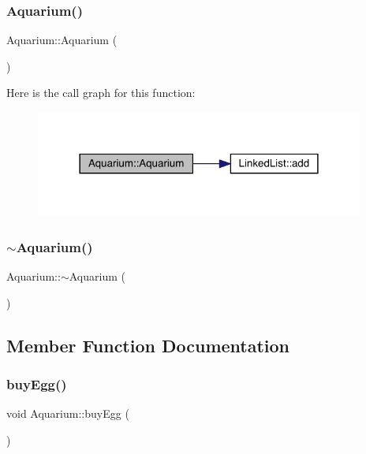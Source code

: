 \subsubsection{\texorpdfstring{Aquarium()}{Aquarium()}}
{\footnotesize\ttfamily Aquarium\+::\+Aquarium (\begin{DoxyParamCaption}{ }\end{DoxyParamCaption})}

Here is the call graph for this function\+:
\nopagebreak
\begin{figure}[H]
\begin{center}
\leavevmode
\includegraphics[width=306pt]{class_aquarium_a0176cc59bd34e39fd3d79d56d4db4d08_cgraph}
\end{center}
\end{figure}
\mbox{\label{class_aquarium_a40f31f27104d48e4f558d40059f4a590}} 
\subsubsection{\texorpdfstring{$\sim$\+Aquarium()}{~Aquarium()}}
{\footnotesize\ttfamily Aquarium\+::$\sim$\+Aquarium (\begin{DoxyParamCaption}{ }\end{DoxyParamCaption})}



\subsection{Member Function Documentation}
\mbox{\label{class_aquarium_a5e26a35a516d1e6db1e3c4b7f367e498}} 
\subsubsection{\texorpdfstring{buy\+Egg()}{buyEgg()}}
{\footnotesize\ttfamily void Aquarium\+::buy\+Egg (\begin{DoxyParamCaption}{ }\end{DoxyParamCaption})}

